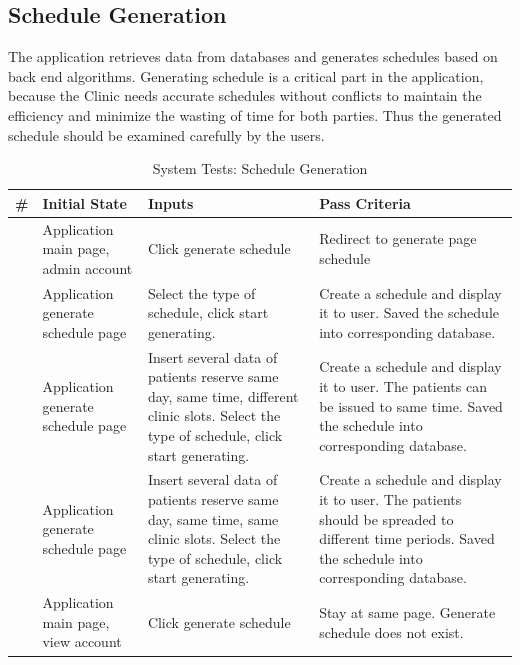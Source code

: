 \documentclass[12pt]{article}
\newcounter{TestCounter}
\begin{document}
\subsection{Schedule Generation} 
The application retrieves data from databases and generates schedules based on back end algorithms. Generating schedule is a critical part in the application, because the Clinic needs accurate schedules without conflicts to maintain the efficiency and minimize the wasting of time for both parties. Thus the generated schedule should be examined carefully by the users. 
\begin{center}
	\begin{longtable}{c>{\raggedright\arraybackslash}p{4.8cm} >{\raggedright\arraybackslash}p{3cm}>{\raggedright\arraybackslash}p{3cm}}
		\caption{System Tests: Schedule Generation}\label{ScheduleGeneration_SystemTests}\\
		\toprule
		\bf \# & \bf Initial State & \bf Inputs & \bf Pass Criteria \\\midrule
		\stepcounter{TestCounter}\arabic{TestCounter} 
		& Application main page, admin account
		& Click generate schedule
		& Redirect to generate page schedule
		\\\midrule
		\stepcounter{TestCounter}\arabic{TestCounter} 
		& Application generate schedule page 
		& Select the type of schedule, click start generating.
		& Create a schedule and display it to user. Saved the schedule into corresponding database.
		\\\midrule
		\stepcounter{TestCounter}\arabic{TestCounter} 
		& Application generate schedule page
		& Insert several data of patients reserve same day, same time, different clinic slots. Select the type of schedule, click start generating.
		& Create a schedule and display it to user. The patients can be issued to same time. Saved the schedule into corresponding database.
		\\\midrule
		\stepcounter{TestCounter}\arabic{TestCounter} 
		& Application generate schedule page
		& Insert several data of patients reserve same day, same time, same clinic slots. Select the type of schedule, click start generating.
		& Create a schedule and display it to user. The patients should be spreaded to different time periods. Saved the schedule into corresponding database.
		\\\midrule
		\stepcounter{TestCounter}\arabic{TestCounter} 
		& Application main page, view account
		& Click generate schedule
		& Stay at same page.
		Generate schedule does not exist.
		\\\midrule
		\bottomrule
	\end{longtable}
\end{center}
\end{document}
